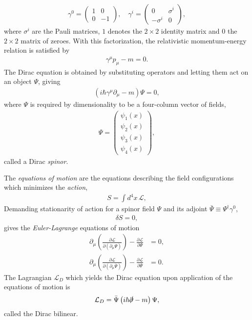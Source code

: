 \documentclass[twoside,english]{uiofysmaster}
\begin{document}
\begin{align}
	\gamma^0 = \begin{pmatrix}
		1 & 0 \\ 0 & -1
	\end{pmatrix}, \quad{} \gamma^i = \begin{pmatrix}
		0 & \sigma^i \\ -\sigma^i & 0
	\end{pmatrix},
\end{align}
where $\sigma^i$ are the Pauli matrices, $1$ denotes the $2\times 2$ identity matrix and $0$ the $2\times 2$ matrix of zeroes. With this factorization, the relativistic momentum-energy relation is satisfied by
\begin{align}
	\gamma^\mu p_\mu - m = 0.
\end{align}
The Dirac equation is obtained by substituting operators and letting them act on an object $\Psi$, giving
\begin{align}
	\left(i\hbar \gamma^\mu \partial_\mu - m\right)\Psi = 0,
\end{align}
where $\Psi$ is required by dimensionality to be a four-column vector of fields,
\begin{align}
	\Psi = \begin{pmatrix}
		\psi_1(x) \\ \psi_2(x) \\ \psi_3(x) \\ \psi_4(x)
	\end{pmatrix},
\end{align}
called a Dirac {\it spinor}.

The {\it equations of motion} are the equations describing the field configurations which minimizes the {\it action},
\begin{align}
	S = \int d^4 x \, \mathcal{L},
\end{align}
Demanding stationarity of action for a spinor field $\Psi$ and its adjoint $\bar\Psi \equiv  \Psi^\dag \gamma^0$,
\begin{align}
	\delta S = 0,
\end{align}
gives the {\it Euler-Lagrange} equations of motion
\begin{align}
	\partial_{\mu}\left(\frac{\partial\mathcal{L}}{\partial\left(\partial_{\mu}\Psi\right)}\right) - \frac{\partial\mathcal{L}}{\partial\Psi} &= 0,\\
	\partial_{\mu}\left(\frac{\partial\mathcal{L}}{\partial\left(\partial_{\mu}\bar\Psi\right)}\right) - \frac{\partial\mathcal{L}}{\partial\bar\Psi} &= 0.
\end{align}
The Lagrangian $\mathcal{L}_D$ which yields the Dirac equation upon application of the equations of motion is
\begin{align}
	\mathcal{L}_D = \bar \Psi \left( i\hbar \slashed \partial - m \right)\Psi,
\end{align}
called the Dirac bilinear.
\end{document}

